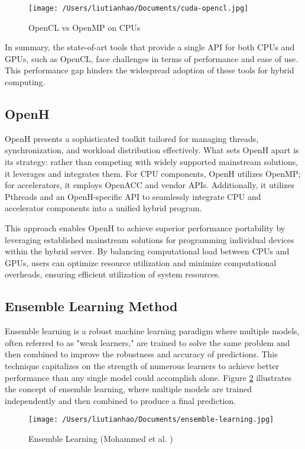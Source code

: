 \documentclass[13pt]{article}
\begin{document}
\begin{figure}[h!]
    \centering
    \texttt{[image: /Users/liutianhao/Documents/cuda-opencl.jpg]}
    \caption{OpenCL vs OpenMP on CPUs}
    \label{fig:opencl_openmp}
\end{figure}

In summary, the state-of-art tools that provide a single API for both CPUs and GPUs, such as OpenCL, face challenges in terms of performance and ease of use.
This performance gap hinders the widespread adoption of these tools for hybrid computing.


\subsection{OpenH}
OpenH presents a sophisticated toolkit tailored for managing threads, synchronization, and workload distribution effectively. What sets OpenH apart is its strategy: rather than competing with widely supported mainstream solutions, it leverages and integrates them. For CPU components, OpenH utilizes OpenMP; for accelerators, it employs OpenACC and vendor APIs. Additionally, it utilizes Pthreads and an OpenH-specific API to seamlessly integrate CPU and accelerator components into a unified hybrid program.

This approach enables OpenH to achieve superior performance portability by leveraging established mainstream solutions for programming individual devices within the hybrid server. By balancing computational load between CPUs and GPUs, users can optimize resource utilization and minimize computational overheads, ensuring efficient utilization of system resources.


\subsection{Ensemble Learning Method}
Ensemble learning is a robust machine learning paradigm where multiple models, often referred to as "weak learners," are trained to solve the same problem and then combined to improve the robustness and accuracy of predictions. 
This technique capitalizes on the strength of numerous learners to achieve better performance than any single model could accomplish alone. 
Figure \ref{fig:ensemble_learning} illustrates the concept of ensemble learning, where multiple models are trained independently and then combined to produce a final prediction.
\begin{figure}[h!]
    \centering
    \texttt{[image: /Users/liutianhao/Documents/ensemble-learning.jpg]}
    \caption{Ensemble Learning (Mohammed et al. \cite{ensemble_learning})}
    \label{fig:ensemble_learning}
\end{figure}
\end{document}
